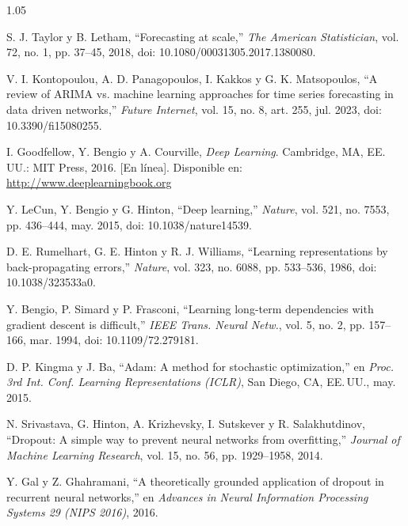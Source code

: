 \documentclass[12pt,letterpaper]{report}
\begin{document}
\begin{spacing}{1.05}
\begin{enumerate}[label={[\arabic*]}, leftmargin=0.9cm, labelsep=0.3cm, itemsep=4pt, parsep=0pt, topsep=0pt]
    \item \label{bib:32} S. J. Taylor y B. Letham, ``Forecasting at scale,'' \textit{The American Statistician}, vol. 72, no. 1, pp. 37--45, 2018, doi: 10.1080/00031305.2017.1380080.

    \item \label{bib:33} V. I. Kontopoulou, A. D. Panagopoulos, I. Kakkos y G. K. Matsopoulos, ``A review of ARIMA vs. machine learning approaches for time series forecasting in data driven networks,'' \textit{Future Internet}, vol. 15, no. 8, art. 255, jul. 2023, doi: 10.3390/fi15080255.

    \item \label{bib:34} I. Goodfellow, Y. Bengio y A. Courville, \textit{Deep Learning}. Cambridge, MA, EE.\,UU.: MIT Press, 2016. [En línea]. Disponible en: \url{http://www.deeplearningbook.org}

    \item \label{bib:35} Y. LeCun, Y. Bengio y G. Hinton, ``Deep learning,'' \textit{Nature}, vol. 521, no. 7553, pp. 436--444, may. 2015, doi: 10.1038/nature14539.

    \item \label{bib:36} D. E. Rumelhart, G. E. Hinton y R. J. Williams, ``Learning representations by back-propagating errors,'' \textit{Nature}, vol. 323, no. 6088, pp. 533--536, 1986, doi: 10.1038/323533a0.

    \item \label{bib:37} Y. Bengio, P. Simard y P. Frasconi, ``Learning long-term dependencies with gradient descent is difficult,'' \textit{IEEE Trans. Neural Netw.}, vol. 5, no. 2, pp. 157--166, mar. 1994, doi: 10.1109/72.279181.

    \item \label{bib:38} D. P. Kingma y J. Ba, ``Adam: A method for stochastic optimization,'' en \textit{Proc. 3rd Int. Conf. Learning Representations (ICLR)}, San Diego, CA, EE.\,UU., may. 2015.

    \item \label{bib:39} N. Srivastava, G. Hinton, A. Krizhevsky, I. Sutskever y R. Salakhutdinov, ``Dropout: A simple way to prevent neural networks from overfitting,'' \textit{Journal of Machine Learning Research}, vol. 15, no. 56, pp. 1929--1958, 2014.

    \item \label{bib:40} Y. Gal y Z. Ghahramani, ``A theoretically grounded application of dropout in recurrent neural networks,'' en \textit{Advances in Neural Information Processing Systems 29 (NIPS 2016)}, 2016.


\end{enumerate}
\end{spacing}
\end{document}
